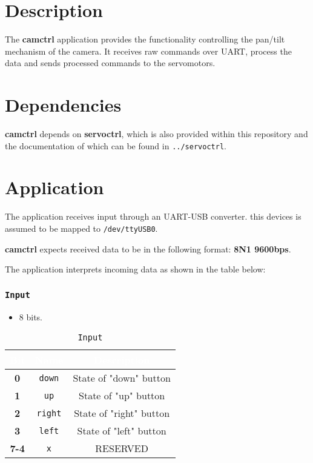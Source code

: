 \section{Description}
The \textbf{camctrl} application provides the functionality controlling the
pan/tilt mechanism of the camera.
It receives raw commands over UART, process the data and sends processed
commands to the servomotors.

\section{Dependencies}
\textbf{camctrl} depends on \textbf{servoctrl}, which is also provided within
this repository and the documentation of which can be found in
\texttt{../servoctrl}.

\section{Application}
The application receives input through an UART-USB converter. this devices is
assumed to be mapped to \texttt{/dev/ttyUSB0}.

\textbf{camctrl} expects received data to be in the following format:
\textbf{8N1 9600bps}.

The application interprets incoming data as shown in the table below:

   \subsubsection{\texttt{Input}}
   \begin{itemize}
      \item 8 bits.
   \end{itemize}
   \begin{table}[!htb]
      \begin{center}
         \begin{tabular}{|c|c|c|}
            \rowcolor{black}
            \textcolor{white}{\textbf{Bit}}  &
            \textcolor{white}{\textbf{Name}} &
            \textcolor{white}{\textbf{Description}}\\
            \hline
            \hline
            \textbf{0}   & \texttt{down}  & State of "down" button \\
            \hline
            \textbf{1}   & \texttt{up}    & State of "up" button \\
            \hline
            \textbf{2}   & \texttt{right} & State of "right" button \\
            \hline
            \textbf{3}   & \texttt{left}  & State of "left" button \\
            \hline
            \textbf{7-4} & \texttt{x} & RESERVED \\
            \hline
         \end{tabular}
         \caption{\texttt{Input}}
         \label{table:input}
      \end{center}
   \end{table}

